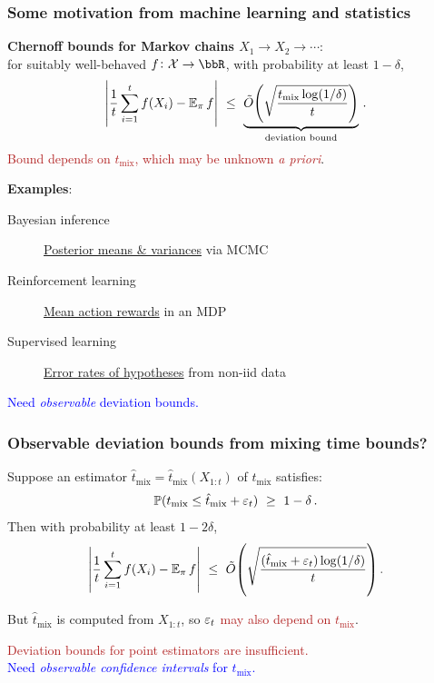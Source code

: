\documentclass[11pt,compress,blue4,notheorems,handout]{beamer}
\newcommand{\BLUE}[1]{\textcolor{blue}{#1}}
\newcommand{\FIREBRICK}[1]{\textcolor{firebrick}{#1}}
\newcommand\tmix{\ensuremath{t_{\operatorname{mix}}}}
\newcommand\tmixhat{\ensuremath{\hat{t}_{\operatorname{mix}}}}
\newcommand\states{\ensuremath{\mathcal{X}}}
\begin{document}
\begin{frame}
  \frametitle{Some motivation from machine learning and statistics}

  \textbf{Chernoff bounds for Markov chains $X_1\to X_2\to\dotsb$}:
  \\
  for suitably well-behaved $f \colon \states \to \bbR$,
  with probability at least $1-\delta$,
  \[
    \Abs{
      \frac1t\sum_{i=1}^t f(X_i)
      -
      \E_\pi f
    }
    \ \leq \
    \underbrace{
      \tilde O\Parens{
        \sqrt{
          \frac{\tmix \log(1/\delta)}{t}
        }
      }
    }_{\text{deviation bound}}
    \,.
  \]
  \FIREBRICK{Bound depends on $\tmix$, which may be unknown \emph{a
  priori}}.

  \bigskip
  \textbf{Examples}:
  \begin{description}
    \item[Bayesian inference]
      \underline{Posterior means \& variances} via MCMC

    \item[Reinforcement learning]
      \underline{Mean action rewards} in an MDP

    \item[Supervised learning]
      \underline{Error rates of hypotheses} from non-iid data

  \end{description}

  \begin{center}
    \BLUE{%
      Need \emph{observable} deviation bounds.
    }
  \end{center}

\end{frame}


\begin{frame}
  \frametitle{Observable deviation bounds from mixing time bounds?}

  Suppose an estimator $\tmixhat = \tmixhat(X_{1:t})$ of
  $\tmix$ satisfies:
  \[
    \P(\tmix \leq \tmixhat + \veps_t)
    \ \geq \
    1-\delta
    \,.
  \]
  \onslide<2->
  Then with probability at least $1-2\delta$,
  \[
    \Abs{
      \frac1t\sum_{i=1}^t f(X_i)
      -
      \E_\pi f
    }
    \ \leq \
    \tilde O\Parens{
      \sqrt{
        \frac{\parens{\tmixhat + \veps_t} \log(1/\delta)}{t}
      }
    }
    \,.
  \]

  But $\tmixhat$ is computed from $X_{1:t}$, so
  \FIREBRICK{$\varepsilon_t$ may also depend on $\tmix$}.

  \onslide<4->
  \begin{center}
    \FIREBRICK{%
      Deviation bounds for point estimators are insufficient.%
    }
    \\
    \BLUE{%
      Need \emph{observable confidence intervals} for $\tmix$.%
    }
  \end{center}

\end{frame}
\end{document}
